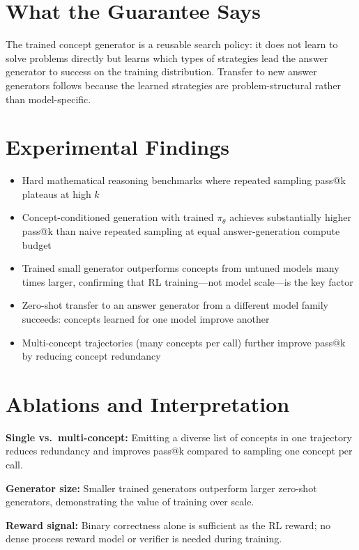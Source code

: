 \documentclass[10pt,twocolumn]{article}
\begin{document}
\section{What the Guarantee Says}

The trained concept generator is a reusable search policy: it does not learn
to solve problems directly but learns which types of strategies lead the
answer generator to success on the training distribution. Transfer to new
answer generators follows because the learned strategies are problem-structural
rather than model-specific.

\section{Experimental Findings}

\begin{itemize}[itemsep=2pt,parsep=0pt]
  \item Hard mathematical reasoning benchmarks where repeated sampling
    pass@k plateaus at high $k$
  \item Concept-conditioned generation with trained $\pi_\theta$ achieves
    substantially higher pass@k than naive repeated sampling at equal
    answer-generation compute budget
  \item Trained small generator outperforms concepts from untuned models
    many times larger, confirming that RL training---not model scale---is
    the key factor
  \item Zero-shot transfer to an answer generator from a different model
    family succeeds: concepts learned for one model improve another
  \item Multi-concept trajectories (many concepts per call) further improve
    pass@k by reducing concept redundancy
\end{itemize}

\section{Ablations and Interpretation}

\textbf{Single vs.\ multi-concept:} Emitting a diverse list of concepts in
one trajectory reduces redundancy and improves pass@k compared to sampling
one concept per call.

\textbf{Generator size:} Smaller trained generators outperform larger
zero-shot generators, demonstrating the value of training over scale.

\textbf{Reward signal:} Binary correctness alone is sufficient as the RL
reward; no dense process reward model or verifier is needed during training.
\end{document}
